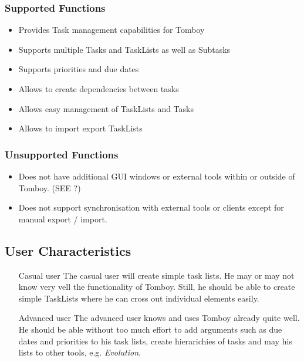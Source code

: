  \subsubsection*{Supported Functions}
  \label{description:functions:supported}

    \begin{itemize}
      \item Provides Task management capabilities for Tomboy
      \item Supports multiple Tasks and TaskLists as well as Subtasks
      \item Supports priorities and due dates
      \item Allows to create dependencies between tasks
      \item Allows easy management of TaskLists and Tasks
      \item Allows to import export TaskLists
    \end{itemize}

    \subsubsection*{Unsupported Functions}
      \label{description:functions:unsupported}
      \begin{itemize}
        \item Does not have additional GUI windows or external tools within or outside of Tomboy. (SEE ?) %
        \item Does not support synchronisation with external tools or clients except for manual export / import.
      \end{itemize}

\subsection{User Characteristics}
\label{description:usercharacteristics}

  \begin{itemize}
    \item[Casual user] The casual user will create simple task lists. He may or may not know very vell the functionality of Tomboy. Still, he should be able to create simple TaskLists where he can cross out individual elements easily.

    \item [Advanced user] The advanced user knows and uses Tomboy already quite well. He should be able without too much effort to add arguments such as due dates and priorities to his task lists, create hierarichies of tasks and may his lists to other tools, e.g. \textit{Evolution}.
  \end{itemize}


